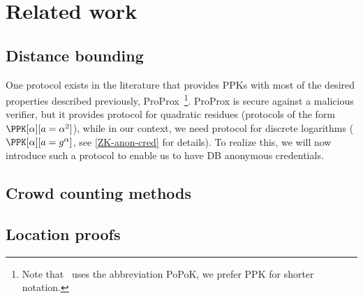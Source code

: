 \section{Related work}%
\label{related-work}

\subsection{Distance bounding}

One protocol exists in the literature that provides \acp{PPK} with most of the 
desired properties described previously, ProProx~\cite{ProProx}\footnote{Note 
  that~\cite{ProProx} uses the abbreviation PoPoK, we prefer \acs{PPK} for 
  shorter notation.}.
ProProx is secure against a malicious verifier, but it provides  protocol for quadratic residues (\ie protocols of the form \(\PPK[\alpha][a = 
  \alpha^2]\)), while in our context, we need  protocol for discrete 
logarithms (\ie \(\PPK[\alpha][a = g^\alpha]\), see \cref{ZK-anon-cred} for 
details).
To realize this, we will now introduce such a protocol to enable us to have 
\ac{DB} anonymous credentials.

\subsection{Crowd counting methods}


\subsection{Location proofs}


